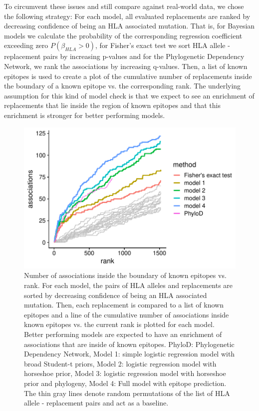 \documentclass{bioinfo}
\begin{document}
To circumvent these issues and still compare against real-world data, we chose the following strategy:
For each model, all evaluated replacements are ranked by decreasing confidence of being an HLA associated mutation. That is, for Bayesian models we calculate the probability of the corresponding regression coefficient exceeding zero \(P(\beta_{HLA} > 0)\), for Fisher's exact test we sort HLA allele - replacement pairs by increasing p-values and for the Phylogenetic Dependency Network, we rank the associations by increasing q-values.
Then, a list of known epitopes is used to create a plot of the cumulative number of replacements inside the boundary of a known epitope vs. the corresponding rank. The underlying assumption for this kind of model check is that we expect to see an enrichment of replacements that lie inside the region of known epitopes and that this enrichment is stronger for better performing models.

\begin{figure}[ht!]
  \includegraphics[width=1\linewidth]{plots/comparison.pdf}
  \caption{Number of associations inside the boundary of known epitopes vs. rank. For each model, the pairs of HLA alleles and replacements are sorted by decreasing confidence of being an HLA associated mutation. Then, each replacement is compared to a list of known epitopes and a line of the cumulative number of associations inside known epitopes vs. the current rank is plotted for each model. Better performing models are expected to have an enrichment of associations that are inside of known epitopes. 
  PhyloD: Phylogenetic Dependency Network, Model 1: simple logistic regression model with broad Student-t priors, Model 2: logistic regression model with horseshoe prior, Model 3: logistic regression model with horseshoe prior and phylogeny, Model 4: Full model with epitope prediction. The thin gray lines denote random permutations of the list of HLA allele - replacement pairs and act as a baseline.}
  \label{fig:comparison}
\end{figure}
\end{document}
